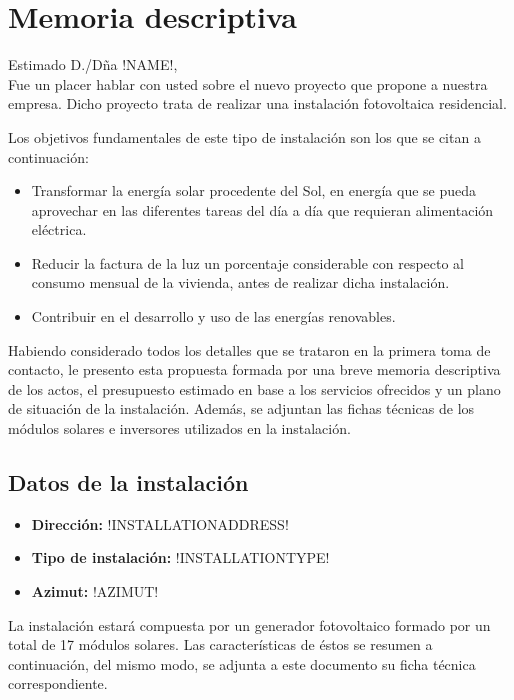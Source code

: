 
\chapter{Memoria descriptiva} 
\AddToShipoutPicture{\BackgroundPic}	
\large		 
\begin{spacing}{1.2}
Estimado D./Dña !NAME!,\\
Fue un placer hablar con usted sobre el nuevo proyecto que propone a nuestra empresa. Dicho proyecto trata de realizar una instalación fotovoltaica residencial.

Los objetivos fundamentales de este tipo de instalación son los que se citan a continuación:

\begin{itemize}\itemsep1pt \parskip0pt 
\item Transformar la energía solar procedente del Sol, en energía que se pueda aprovechar en las diferentes tareas del día a día que requieran alimentación eléctrica. 
\item Reducir la factura de la luz un porcentaje considerable con respecto al consumo mensual de la vivienda, antes de realizar dicha instalación.
\item Contribuir en el desarrollo y uso de las energías renovables.
\end{itemize}

Habiendo considerado todos los detalles que se trataron en la primera toma de contacto, le presento esta propuesta formada por una breve memoria descriptiva de los actos, el presupuesto estimado en base a los servicios ofrecidos y un plano de situación de la instalación. Además, se adjuntan las fichas técnicas de los módulos solares e inversores utilizados en la instalación.
				 
\section*{Datos de la instalación}

\begin{itemize}\itemsep1pt \parskip0pt 
\item \textbf{Dirección:} !INSTALLATIONADDRESS! 
\item \textbf{Tipo de instalación:} !INSTALLATIONTYPE!
\item \textbf{Azimut:} !AZIMUT!
\end{itemize}
La instalación estará compuesta por un generador fotovoltaico formado por un total de 17 módulos solares. Las características de éstos se resumen a continuación, del mismo modo, se adjunta a este documento su ficha técnica correspondiente.


\end{spacing}
